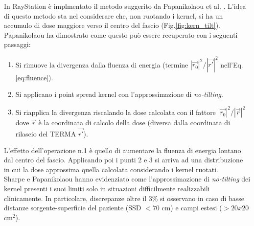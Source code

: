 {In RayStation è implmentato il metodo suggerito da Papanikolaou et al. \cite{Papanikolaou1993}. L'idea di questo metodo sta nel considerare che, non ruotando i kernel, si ha un accumulo di dose maggiore verso il centro del fascio (Fig.\ref{fig:kern_tilt}).\\ 
Papanikolaou ha dimostrato come questo può essere recuperato con i seguenti passaggi:
\begin{enumerate}
\item Si rimuove la divergenza dalla fluenza di energia (termine $|\vec{r_0}|^2/|\vec{r'}|^2$ nell'Eq.\ref{eq:fluence}).
\item Si applicano i point spread kernel con l'approssimazione di \textit{no-tilting}.
\item Si riapplica la divergenza riscalando la dose calcolata con il fattore $|\vec{r_0}|^2/|\vec{r}|^2$ dove $\vec{r}$ è la coordinata di calcolo della dose (diversa dalla coordinata di rilascio del TERMA $\vec{r'}$).
\end{enumerate}
L'effetto dell'operazione n.1 è quello di aumentare la fluenza di energia lontano dal centro del fascio. Applicando poi i punti 2 e 3 si arriva ad una distribuzione in cui la dose approssima quella calcolata considerando i kernel ruotati.\\
Sharpe e Papanikolaou \cite{Sharpe1997,Papanikolaou1993} hanno evidenziato come l'approssimazione di \textit{no-tilting} dei kernel presenti i suoi limiti solo in situazioni difficilmente realizzabili clinicamente. In particolare, discrepanze oltre il 3\% si osservano in caso di basse distanze sorgente-superficie del paziente (SSD $< 70$ cm) e campi estesi ($> 20x20$ cm$^2$).



}
